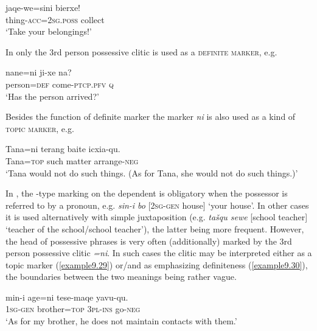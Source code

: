 \documentclass[output=paper,colorlinks,citecolor=brown]{langscibook}
\begin{document}
\ea
    \label{example9.26}
    \gll jaqe-we=sini 		bierxe!\\
    thing-\textsc{acc}=2\textsc{sg.poss}	collect\\
    \glt `Take your belongings!'\\
    \z

In  only the 3rd person possessive clitic is used as a \textsc{definite marker}, e.g.

\ea
    \label{example9.27}
    \gll nane=ni 	ji-xe			na?\\
    person=\textsc{def} 	come-\textsc{ptcp.pfv}	\textsc{q}\\
    \glt `Has the person arrived?'\\
    \z

Besides the function of definite marker the  marker \textit{ni} is also used as a kind of \textsc{topic marker}, e.g.

\ea
    \label{example9.28}
    \gll Tana=ni 	terang 	baite 	icxia-qu.\\
    Tana=\textsc{top}	such	matter 	arrange-\textsc{neg}\\
    \glt `Tana would not do such things. (As for Tana, she would not do such things.)'\\
    \z


In , the -type marking on the dependent is obligatory when the possessor is referred to by a pronoun, e.g. \textit{sin-i bo} [2\textsc{sg-gen} house] ‘your house’. In other cases it is used alternatively with simple juxtaposition (e.g. \textit{tašqu sewe} [school teacher] ‘teacher of the school/school teacher’), the latter being more frequent. However, the head of possessive phrases is very often (additionally) marked by the 3rd person possessive clitic \textit{=ni}. In such cases the clitic may be interpreted either as a topic marker (\ref{example9.29}) or/and as emphasizing definiteness (\ref{example9.30}), the boundaries between the two meanings being rather vague.  

\ea
    \label{example9.29}
    \gll min-i 		age=ni 	tese-maqe 	yavu-qu.\\
    1\textsc{sg-gen}	brother=\textsc{top}	3\textsc{pl-ins}	go-\textsc{neg}\\
    \glt `As for my brother, he does not maintain contacts with them.'\\
    \z
\end{document}
